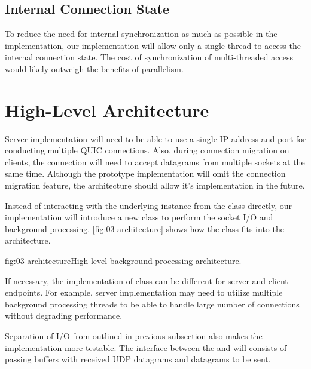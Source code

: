 \subsection{Internal Connection State}

To reduce the need for internal synchronization as much as possible in the \QuicConnection{}
implementation, our implementation will allow only a single thread to access the internal connection
state. The cost of synchronization of multi-threaded access would likely outweigh the benefits of
parallelism.

\section{High-Level Architecture}

Server implementation will need to be able to use a single IP address and port for conducting
multiple QUIC connections.  Also, during connection migration on
clients, the connection will need to accept datagrams from multiple sockets at the same time.
Although the prototype implementation will omit the connection migration feature, the architecture
should allow it's implementation in the future.

Instead of interacting with the underlying  instance from the \QuicConnection{} class
directly, our implementation will introduce a new \QuicSocketContext{} class to perform the socket
I/O and background processing. \autoref{fig:03-architecture} shows how the \QuicSocketContext{}
class fits into the architecture.


\begin{myFigure}{fig:03-architecture}{High-level background processing architecture.}

  

\end{myFigure}

If necessary, the implementation of \QuicSocketContext{} class can be different for server and
client endpoints. For example, server implementation may need to utilize multiple background
processing threads to be able to handle large number of connections without degrading performance.


Separation of I/O from \QuicConnection{} outlined in previous subsection also makes the
implementation more testable. The interface between the \QuicSocketContext{} and \QuicConnection{}
will consists of passing buffers with received UDP datagrams and datagrams to be sent.

